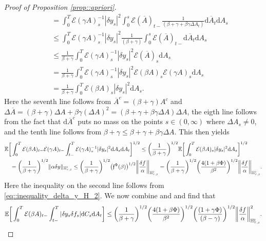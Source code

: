 \documentclass[10pt]{article} %
\newcommand\cE{\mathcal E}
\newcommand{\smalltext}[1]{\text{\fontsize{4}{4}\selectfont$#1$}}
\newcommand\ff{\mathfrak f}
\def \E{\mathbb{E}}
\def \H{\mathbb{H}}
\newcommand{\1}{\mathbf{1}}
\def\d{\mathrm{d}}
\begin{document}
\begin{proof}[Proof of Proposition \ref{prop::apriori}]
\begin{align}
	&\quad = \int_0^T \cE(\gamma A)^{-1}_s |\delta y_s|^2  \int_0^s \cE(\overline A)_{t-} \frac{1}{(\beta + \gamma + \beta\gamma\Delta A_t)} \d\overline A_t \d A_s \nonumber\\
	&\quad \leq \int_0^T \cE(\gamma A)^{-1}_s |\delta y_s|^2 \frac{1}{(\beta + \gamma)} \int_0^s \cE(\overline A)_{t-} \d\overline A_t \d A_s \nonumber\\
	&\quad \leq \frac{1}{\beta+\gamma} \int_0^T \cE(\gamma A)^{-1}_s |\delta y_s|^2 \cE(\overline A)_{s} \d A_s \nonumber\\
	&\quad = \frac{1}{\beta+\gamma} \int_0^T \cE(\gamma A)^{-1}_s |\delta y_s|^2 \cE(\beta A)_s \cE(\gamma A)_s \d A_s \nonumber\\
	&\quad = \frac{1}{\beta+\gamma} \int_0^T \cE(\beta A)_s |\delta y_s|^2  \d A_s.
\end{align}
Here the seventh line follows from $\overline A^c = (\beta + \gamma) A^c$ and $\Delta \overline A = (\beta + \gamma)\Delta A + \beta\gamma(\Delta A)^2 = (\beta + \gamma + \beta\gamma\Delta A)\Delta A$, the eigth line follows from the fact that $\d\overline A^c$ puts no mass on the points $s \in (0,\infty)$ where $\Delta A_s \neq 0$, and the tenth line follows from $\beta + \gamma \leq \beta + \gamma + \beta\gamma \Delta A$. This then yields
\begin{align}\label{eq8}
	&\E\bigg[ \int_0^T \cE(\beta A)_{t-}\cE(\gamma A)_{t-}\int_{t-}^T \cE(\gamma A)^{-1}_s |\delta y_s|^2 \d A_s \d A_t \bigg]^{1/2} \leq \bigg(\frac{1}{\beta+\gamma}\bigg)^{1/2}\E\bigg[\int_0^T\cE(\beta A)_s |\delta y_s|^2 \d A_s\bigg]^{1/2} \nonumber\\
	&\quad = \bigg(\frac{1}{\beta + \gamma}\bigg)^{1/2} \|\alpha\delta y\|_{\H^\smalltext{2}_{\smalltext{T}\smalltext{,}\smalltext{\beta}}} 
	\leq \bigg(\frac{1}{\beta + \gamma}\bigg)^{1/2} \big(\ff^\Phi(\beta)\big)^{1/2}\bigg\|\frac{\delta f}{\alpha}\bigg\|_{\H^\smalltext{2}_{\smalltext{T}\smalltext{,}\smalltext{\beta}}}
	= \bigg(\frac{1}{\beta + \gamma}\bigg)^{1/2} \bigg(\frac{4(1+\beta\Phi)}{\beta^2}\bigg)^{1/2}\bigg\|\frac{\delta f}{\alpha}\bigg\|_{\H^\smalltext{2}_{\smalltext{T}\smalltext{,}\smalltext{\beta}}}.
\end{align}
Here the inequality on the second line follows from \eqref{eq::inequality_delta_y_H_2}. We now combine  and  and find that
\begin{equation*}
	\E\bigg[ \int_0^T \cE(\beta A)_{t-}\int_{t-}^T |\delta y_s \delta f_s| \d C_s \d A_t \bigg] 
	\leq \bigg(\frac{1}{\beta + \gamma}\bigg)^{1/2} \bigg(\frac{4(1+\beta\Phi)}{\beta^2}\bigg)^{1/2} \bigg(\frac{(1+\gamma\Phi)}{(\beta-\gamma)}\bigg)^{1/2} \bigg\|\frac{\delta f}{\alpha} \bigg\|^2_{\H^\smalltext{2}_{\smalltext{T}\smalltext{,}\smalltext{\beta}}}.

\end{equation*}
\end{proof}
\end{document}

